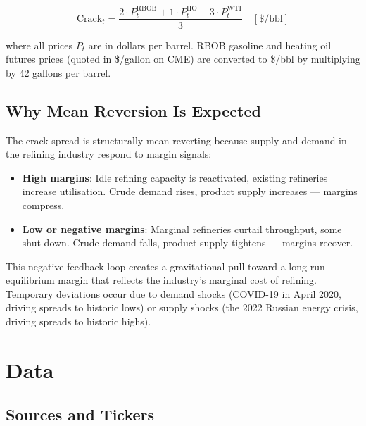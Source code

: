 \documentclass[12pt,a4paper]{article}
\begin{document}
\begin{equation}
  \text{Crack}_t = \frac{2 \cdot P^{\text{RBOB}}_t + 1 \cdot P^{\text{HO}}_t
                         - 3 \cdot P^{\text{WTI}}_t}{3}
  \quad [\$/\text{bbl}]
\end{equation}

where all prices $P_t$ are in dollars per barrel. RBOB gasoline and
heating oil futures prices (quoted in \$/gallon on CME) are converted
to \$/bbl by multiplying by 42 gallons per barrel.

\subsection{Why Mean Reversion Is Expected}

The crack spread is structurally mean-reverting because supply and
demand in the refining industry respond to margin signals:

\begin{itemize}
  \item \textbf{High margins}: Idle refining capacity is reactivated,
        existing refineries increase utilisation. Crude demand rises,
        product supply increases --- margins compress.
  \item \textbf{Low or negative margins}: Marginal refineries curtail
        throughput, some shut down. Crude demand falls, product supply
        tightens --- margins recover.
\end{itemize}

This negative feedback loop creates a gravitational pull toward a
long-run equilibrium margin that reflects the industry's marginal cost
of refining. Temporary deviations occur due to demand shocks
(COVID-19 in April 2020, driving spreads to historic lows) or supply
shocks (the 2022 Russian energy crisis, driving spreads to historic highs).

\section{Data}

\subsection{Sources and Tickers}
\end{document}
